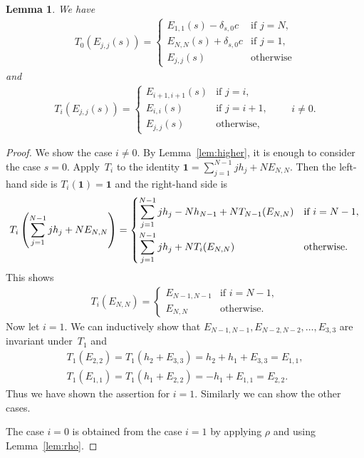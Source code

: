 \documentclass[11pt]{article}
\newtheorem{lem}[thm]{Lemma}
\theoremstyle{definition}
\numberwithin{equation}{section}
\newcommand{\bfid}{\mathbf{1}}
\begin{document}
\begin{lem}\label{lem:diagonal}We have
\begin{gather*}
T_{0}(E_{j,j}(s)) = \begin{cases}
E_{1,1}(s)-\delta_{s,0}c &\text{if } j=N, \\
E_{N,N}(s)+\delta_{s,0}c &\text{if } j=1, \\
E_{j,j}(s) &\text{otherwise}
\end{cases}
\end{gather*}
and
\begin{gather*}
T_{i}(E_{j,j}(s)) = \begin{cases}
E_{i+1,i+1}(s) &\text{if } j=i, \\
E_{i,i}(s) &\text{if } j=i+1,\\
E_{j,j}(s) \ &\text{otherwise},
\end{cases}\qquad i \neq 0.
\end{gather*}
\end{lem}
\begin{proof}We show the case $i \neq 0$. By Lemma~\ref{lem:higher}, it is enough to consider the case $s=0$. Apply~$T_i$ to the identity $\bfid = \sum\limits_{j=1}^{N-1} j h_j + N E_{N,N}$. Then the left-hand side is $T_i(\bfid) = \bfid$ and the right-hand side is
\begin{gather*}
T_i \left(\sum_{j=1}^{N-1} j h_j + N E_{N,N}\right) = \begin{cases}
\displaystyle\sum_{j=1}^{N-1} j h_j - N h_{N-1} + N T_{N-1}(E_{N,N}) & \text{if $i = N-1$}, \vspace{1mm}\\
\displaystyle\sum_{j=1}^{N-1} j h_j + N T_i(E_{N,N}) & \text{otherwise}.
\end{cases}
\end{gather*}
This shows
\begin{gather*}
T_i (E_{N,N}) = \begin{cases}
E_{N-1,N-1} & \text{if $i = N-1$}, \\
E_{N,N} & \text{otherwise}.
\end{cases}
\end{gather*}
Now let $i=1$. We can inductively show that $E_{N-1,N-1}, E_{N-2,N-2}, \ldots, E_{3,3}$ are invariant under~$T_1$ and
\begin{gather*}
T_1(E_{2,2}) = T_1(h_2 + E_{3,3}) = h_2 + h_1 + E_{3,3} = E_{1,1},\\
T_1(E_{1,1}) = T_1(h_1 + E_{2,2}) = -h_1 + E_{1,1} = E_{2,2}.
\end{gather*}
Thus we have shown the assertion for $i=1$. Similarly we can show the other cases.

The case $i=0$ is obtained from the case $i=1$ by applying $\rho$ and using Lemma~\ref{lem:rho}.
\end{proof}
\end{document}

